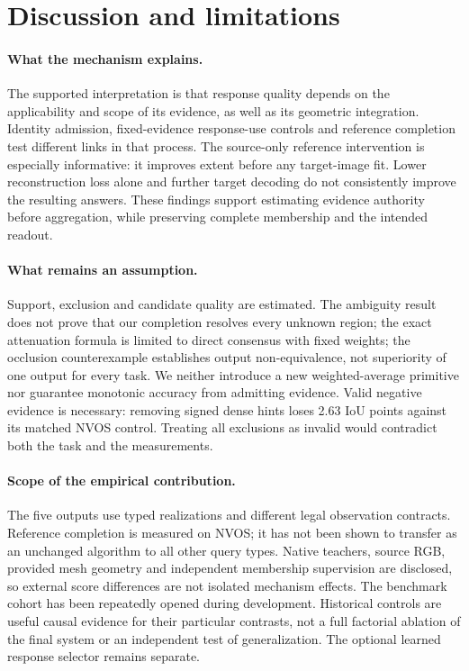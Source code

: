 \section{Discussion and limitations}
\paragraph{What the mechanism explains.}
The supported interpretation is that response quality depends on the
applicability and scope of its evidence, as well as its geometric integration.
Identity admission, fixed-evidence response-use controls and reference
completion test different links in that process. The source-only reference
intervention is especially informative: it improves extent before any
target-image fit. Lower reconstruction loss alone and further target decoding
do not consistently improve the resulting answers. These findings support
estimating evidence authority before aggregation, while preserving complete
membership and the intended readout.

\paragraph{What remains an assumption.}
Support, exclusion and candidate quality are estimated. The ambiguity result
does not prove that our completion resolves every unknown region; the exact
attenuation formula is limited to direct consensus with fixed weights; the
occlusion counterexample establishes output non-equivalence, not superiority
of one output for every task. We neither introduce a new weighted-average
primitive nor guarantee monotonic accuracy from admitting evidence. Valid
negative evidence is necessary: removing signed dense hints loses 2.63 IoU
points against its matched NVOS control. Treating all exclusions as invalid
would contradict both the task and the measurements.

\paragraph{Scope of the empirical contribution.}
The five outputs use typed realizations and different legal observation
contracts. Reference completion is measured on NVOS; it has not been shown to
transfer as an unchanged algorithm to all other query types. Native teachers,
source RGB, provided mesh geometry and independent membership supervision are
disclosed, so external score differences are not isolated mechanism effects.
The benchmark cohort has been repeatedly opened during development.
Historical controls are useful causal evidence for their particular contrasts,
not a full factorial ablation of the final system or an independent test of
generalization. The optional learned response selector remains separate.

